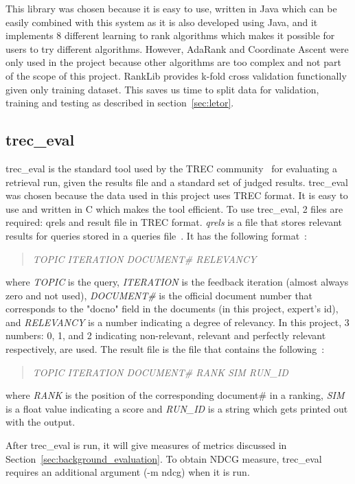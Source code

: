This library was chosen because it is easy to use, written in Java which can be easily combined with this system as it is also developed using Java, and
it implements 8 different learning to rank algorithms which makes it possible for users to try different algorithms.
However, AdaRank and Coordinate Ascent were only used in the project because other algorithms are too complex and not part of the scope of this project.
RankLib provides k-fold cross validation functionally given only training dataset. This saves us time to split data for validation, training and 
testing as described in section~\ref{sec:letor}.

\subsection{trec\_eval}\label{sec:treceval}
trec\_eval is the standard tool used by the TREC community~\cite{trec} for evaluating a retrieval run, given the results file and a
standard set of judged results. trec\_eval was chosen because the data used in this project uses TREC format. 
It is easy to use and written in C which makes the tool efficient. To use trec\_eval, 2 files are required: qrels and result file in TREC format.
\textit{qrels} is a file that stores relevant results for queries stored in a queries file~\cite{qrels}. It has the following format~\cite{qrelsformat}:
\begin{quotation}
 \textit{TOPIC ITERATION DOCUMENT\# RELEVANCY}
\end{quotation}
where \textit{TOPIC} is the query, \textit{ITERATION} is the feedback iteration (almost always zero and not used),
\textit{DOCUMENT\#} is the official document number that corresponds to the "docno" field in the documents (in this project, expert's id), and
\textit{RELEVANCY} is a number indicating a degree of relevancy. In this project, 3 numbers: 0, 1, and 2 indicating non-relevant, relevant and perfectly
relevant respectively, are used. The result file is the file that contains the following~\cite{resultfileformat}:
\begin{quotation}
 \textit{TOPIC ITERATION DOCUMENT\# RANK SIM RUN\_ID}
\end{quotation}
where \textit{RANK} is the position of the corresponding document\# in a ranking, \textit{SIM} is a float value indicating a score and \textit{RUN\_ID}
is a string which gets printed out with the output.

After trec\_eval is run, it will give measures of metrics discussed in Section~\ref{sec:background_evaluation}. To obtain NDCG measure, trec\_eval requires
an additional argument (-m ndcg) when it is run.



